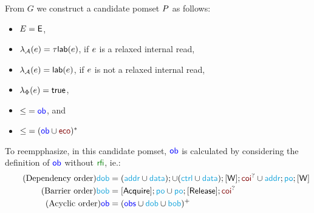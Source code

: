 From $G$ we construct a candidate pomset $P$ as follows:
\begin{itemize}
\item $E= \textsf{E}$,
\item $\lambda_{\mathcal{A}}(e)=\tau \mathsf{lab}(e)$, if $e$ is a relaxed
  internal read, 
\item $\lambda_{\mathcal{A}}(e)=\mathsf{lab}(e)$, if $e$ is not a relaxed
  internal read,
\item $\lambda_{\Phi}(e)=\mathsf{true}$,
\item ${\le} = {\mathrel{\color{blue}\mathsf{ob}}}$, and
\item ${\gtN} = ({\rob} \cup {\reco})^*$
\end{itemize}
To reempphasize, in this candidate pomset, $\mathrel{\color{blue}\mathsf{ob}}$ is calculated by considering the definition of $\mathrel{\color{blue}\mathsf{ob}}$ without $\rrfi$, ie.:
\begin{align*}
  \tag{Dependency order}
  {\rdob} &\eqdef\smash{
    ({\raddr}\cup{\rdata});
    \cup ({\rctrl}\cup{\rdata}); {\IDW}; {\rcoi}^?
    \cup {\raddr}; {\rpox}; {\IDW}
  }
  \\
  \tag{Barrier order}
  {\rbob} &\eqdef\smash{
    {\IDAcq}; {\rpox}
    \cup {\rpox};{\IDRel}; {\rcoi}^?
  }
  \\
  \tag{Acyclic order}
  {\rob} &\eqdef\smash{
    ({\robs} \cup {\rdob} \cup {\rbob})^+
  }
\end{align*}


